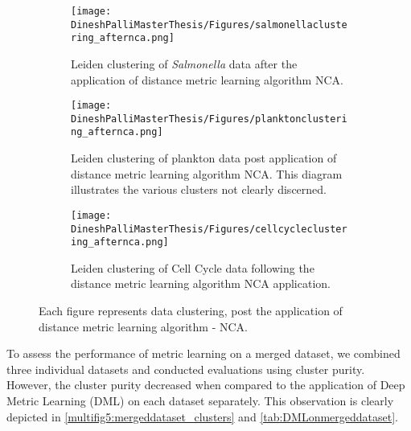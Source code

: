 \documentclass[12pt,a4paper]{article}
\begin{document}
\begin{figure}
  \centering
  \begin{subfigure}{\linewidth}
    \texttt{[image: DineshPalliMasterThesis/Figures/salmonellaclustering\_afternca.png]}
    \caption{Leiden clustering of \textit{Salmonella} data after the application of distance metric learning algorithm NCA.}
    \label{multifig4:image_a}
  \end{subfigure}
  \hfill
  \begin{subfigure}{\linewidth}
    \texttt{[image: DineshPalliMasterThesis/Figures/planktonclustering\_afternca.png]}
    \caption{Leiden clustering of plankton data post application of distance metric learning algorithm NCA. This diagram illustrates the various clusters not clearly discerned.}
    \label{multifig4:image_b}
  \end{subfigure}
  \hfill
  \begin{subfigure}{\linewidth}
    \texttt{[image: DineshPalliMasterThesis/Figures/cellcycleclustering\_afternca.png]}
    \caption{Leiden clustering of Cell Cycle data following the distance metric learning algorithm NCA application.}
    \label{multifig4:image_c}
  \end{subfigure}
  \caption[Clustering after the application of distance metric learning]{Each figure represents data clustering, post the application of distance metric learning algorithm - NCA.}
  \label{multifig4:DML_Clusters}
\end{figure}


To assess the performance of metric learning on a merged dataset, we combined three individual datasets and conducted evaluations using cluster purity. However, the cluster purity decreased when compared to the application of Deep Metric Learning (DML) on each dataset separately. This observation is clearly depicted in \ref{multifig5:mergeddataset_clusters} and \ref{tab:DMLonmergeddataset}.
\end{document}

